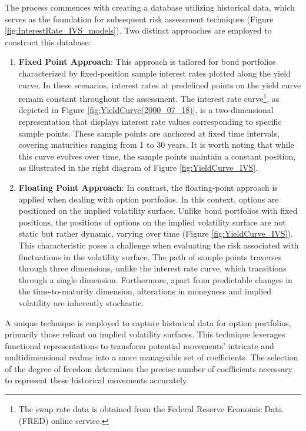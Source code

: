The process commences with creating a database utilizing historical data, which serves as the foundation for subsequent risk assessment techniques (Figure \ref{fig:InterestRate_IVS_models}). Two distinct approaches are employed to construct this database:
\begin{enumerate}
    \item \textbf{Fixed Point Approach}: This approach is tailored for bond portfolios characterized by fixed-position sample interest rates plotted along the yield curve. In these scenarios, interest rates at predefined points on the yield curve remain constant throughout the assessment. The interest rate curve\footnote{The swap rate data is obtained from the Federal Reserve Economic Data (FRED) online service.}, as depicted in Figure \ref{fig:YieldCurve(2000_07_18)}, is a two-dimensional representation that displays interest rate values corresponding to specific sample points. These sample points are anchored at fixed time intervals, covering maturities ranging from 1 to 30 years. It is worth noting that while this curve evolves over time, the sample points maintain a constant position, as illustrated in the right diagram of Figure \ref{fig:YieldCurve_IVS}.
    \item \textbf{Floating Point Approach}: In contrast, the floating-point approach is applied when dealing with option portfolios. In this context, options are positioned on the implied volatility surface. Unlike bond portfolios with fixed positions, the positions of options on the implied volatility surface are not static but rather dynamic, varying over time (Figure \ref{fig:YieldCurve_IVS}). This characteristic poses a challenge when evaluating the risk associated with fluctuations in the volatility surface. The path of sample points traverses through three dimensions, unlike the interest rate curve, which transitions through a single dimension. Furthermore, apart from predictable changes in the time-to-maturity dimension, alterations in moneyness and implied volatility are inherently stochastic. 
\end{enumerate}

A unique technique is employed to capture historical data for option portfolios, primarily those reliant on implied volatility surfaces. This technique leverages functional representations to transform potential movements' intricate and multidimensional realms into a more manageable set of coefficients. The selection of the degree of freedom determines the precise number of coefficients necessary to represent these historical movements accurately.

